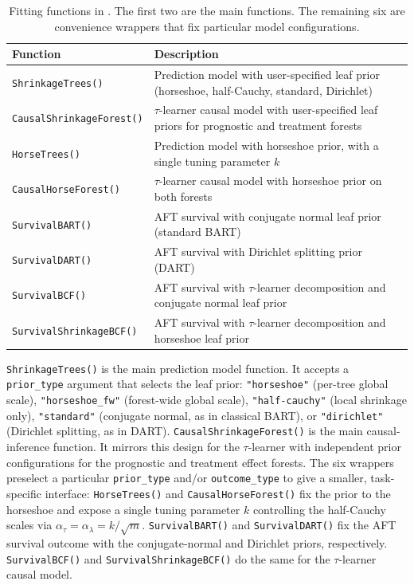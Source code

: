 \begin{table}[!h]
\centering
\caption{\label{tab:fitting-functions}Fitting functions in . The first two
                        are the main functions. The remaining six are convenience wrappers
                        that fix particular model configurations.}
\centering
\begin{tabular}[t]{>{\raggedright\arraybackslash}p{4.5cm}>{\raggedright\arraybackslash}p{9.5cm}}
\toprule
Function & Description\\
\midrule
\texttt{ShrinkageTrees()} & Prediction model with user-specified leaf prior (horseshoe, half-Cauchy, standard, Dirichlet)\\
\texttt{CausalShrinkageForest()} & $\tau$-learner causal model with user-specified leaf priors for prognostic and treatment forests\\
\midrule
\texttt{HorseTrees()} & Prediction model with horseshoe prior, with a single tuning parameter $k$\\
\texttt{CausalHorseForest()} & $\tau$-learner causal model with horseshoe prior on both forests\\
\texttt{SurvivalBART()} & AFT survival with conjugate normal leaf prior (standard BART)\\
\addlinespace
\texttt{SurvivalDART()} & AFT survival with Dirichlet splitting prior (DART)\\
\texttt{SurvivalBCF()} & AFT survival with $\tau$-learner decomposition and conjugate normal leaf prior\\
\texttt{SurvivalShrinkageBCF()} & AFT survival with $\tau$-learner decomposition and horseshoe leaf prior\\
\bottomrule
\end{tabular}
\end{table}

\texttt{ShrinkageTrees()} is the main prediction model function. It accepts a \texttt{prior\_type} argument that selects the leaf prior: \texttt{"horseshoe"} (per-tree global scale), \texttt{"horseshoe\_fw"} (forest-wide global scale), \texttt{"half-cauchy"} (local shrinkage only), \texttt{"standard"} (conjugate normal, as in classical BART), or \texttt{"dirichlet"} (Dirichlet splitting, as in DART). \texttt{CausalShrinkageForest()} is the main causal-inference function. It mirrors this design for the \(\tau\)-learner with independent prior configurations for the prognostic and treatment effect forests. The six wrappers preselect a particular \texttt{prior\_type} and/or \texttt{outcome\_type} to give a smaller, task-specific interface: \texttt{HorseTrees()} and \texttt{CausalHorseForest()} fix the prior to the horseshoe and expose a single tuning parameter \(k\) controlling the half-Cauchy scales via \(\alpha_\tau = \alpha_\lambda = k / \sqrt{m}\). \texttt{SurvivalBART()} and \texttt{SurvivalDART()} fix the AFT survival outcome with the conjugate-normal and Dirichlet priors, respectively. \texttt{SurvivalBCF()} and \texttt{SurvivalShrinkageBCF()} do the same for the \(\tau\)-learner causal model.

